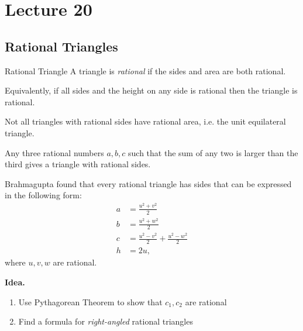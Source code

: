 \documentclass[class=article, crop=false]{standalone}
\begin{document}
  \section{Lecture 20}
  \subsection{Rational Triangles}
  \begin{definition}{Rational Triangle}
    A triangle is \emph{rational} if the sides and area are both rational.
  \end{definition}
  \begin{note}{}
    Equivalently, if all sides and the height on any side is rational then the triangle is rational.
  \end{note}
  Not all triangles with rational sides have rational area, i.e. the unit equilateral triangle.
  \begin{note}{}
    Any three rational numbers $a, b, c$ such that the sum of any two is larger than the third gives a triangle with rational sides.
  \end{note}
  Brahmagupta found that every rational triangle has sides that can be expressed in the following form:
  \begin{align*}
    a &= \frac{u^2 + v^2}{2} \\
    b &= \frac{u^2 + w^2}{2} \\
    c &= \frac{u^2 - v^2}{2} + \frac{u^2 - w^2}{2} \\
    h &= 2u,
  \end{align*}
  where $u, v, w$ are rational. \par
  \textbf{Idea.}
  \begin{enumerate}[label=(\alph*)]
    \item Use Pythagorean Theorem to show that $c_1,c_2$ are rational
    \item Find a formula for \emph{right-angled} rational triangles
  \end{enumerate}
\end{document}
